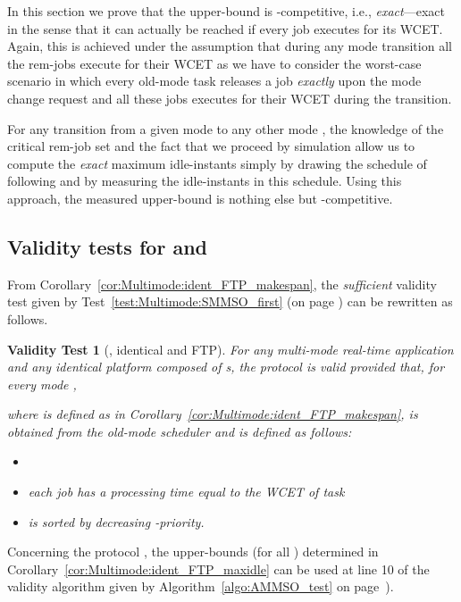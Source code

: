\documentclass{article}
\newtheorem{validity test}{Validity Test}
\begin{document}
In this section we prove that the upper-bound  is -competitive, i.e., {\em exact}---exact in the sense that it can actually be reached if every job executes for its WCET. Again, this is achieved under the assumption that during any mode transition all the rem-jobs execute for their WCET as we have to consider the worst-case scenario in which every old-mode task releases a job \emph{exactly} upon the mode change request and all these jobs executes for their WCET during the transition. 

For any transition from a given mode  to any other mode , the knowledge of the critical rem-job set  and the fact that we proceed by simulation allow us to compute the \emph{exact} maximum idle-instants simply by drawing the schedule of  following  and by measuring the idle-instants in this schedule. Using this approach, the measured upper-bound  is nothing else but -competitive.

\subsection{Validity tests for  and }
\label{sec:Multimode:ident_FTP_validity_test}

From Corollary~\ref{cor:Multimode:ident_FTP_makespan}, the \emph{sufficient} validity test given by Test~\ref{test:Multimode:SMMSO_first} (on page \pageref{test:Multimode:SMMSO_first}) can be rewritten as follows. 

\begin{validity test}[, identical and FTP]
\label{validitytest:Multimode:ident_FTP_SMMSO}
For any multi-mode real-time application  and any identical platform  composed of  s, the protocol  is valid provided that, for every mode ,

where  is defined as in Corollary~\ref{cor:Multimode:ident_FTP_makespan},  is obtained from the old-mode scheduler  and  is defined as follows: 
\begin{itemize}
\renewcommand{\labelitemi}{}
\item 
\item each job  has a processing time equal to the WCET  of task 
\item  is sorted by decreasing -priority. 
\end{itemize}
\end{validity test}

Concerning the protocol , the upper-bounds  (for all ) determined in Corollary~\ref{cor:Multimode:ident_FTP_maxidle} can be used at line 10 of the validity algorithm given by Algorithm~\ref{algo:AMMSO_test} on page~\pageref{algo:AMMSO_test}). 
\end{document}
